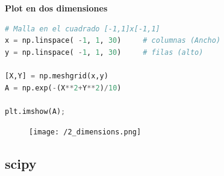 \documentclass[a4paper, openright, 12pt]{article}
\begin{document}
\newpage{}
\textbf{Plot en dos dimensiones}\\

\begin{lstlisting}[language=Python]
# Malla en el cuadrado [-1,1]x[-1,1]
x = np.linspace( -1, 1, 30)     # columnas (Ancho)
y = np.linspace( -1, 1, 30)     # filas (alto)

[X,Y] = np.meshgrid(x,y)
A = np.exp(-(X**2+Y**2)/10)

plt.imshow(A);
\end{lstlisting}

\begin{figure}[ht]
        \centering
        \texttt{[image: /2\_dimensions.png]}
\end{figure}




    \subsection{scipy}
\end{document}
